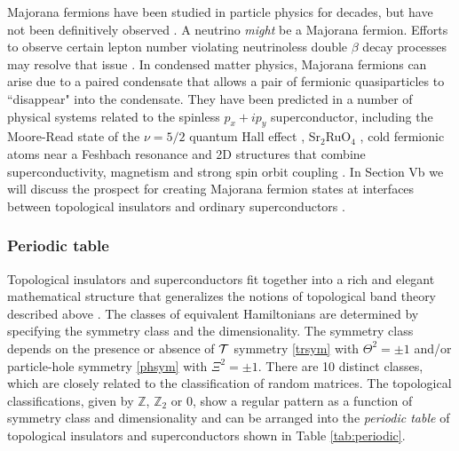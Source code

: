 \documentclass[twocolumn,floatfix,showpacs,rmp,aps]{revtex4}
\begin{document}
Majorana fermions have been studied in particle
physics for decades, but have not been definitively observed \cite{majorana37,wilczek09}.
A neutrino {\it might} be a Majorana fermion.  Efforts to observe
certain lepton number violating
neutrinoless double $\beta$ decay processes may resolve that issue \cite{avignone08}.
In condensed matter physics, Majorana fermions can arise due to
a paired condensate that allows a pair of fermionic quasiparticles to
``disappear" into the condensate.  They have been predicted in a
number of physical systems related to the spinless
$p_x+i p_y$ superconductor, including the Moore-Read state of the
$\nu=5/2$ quantum Hall effect \cite{mooreread91,greiter92,readgreen00}, Sr$_2$RuO$_4$ \cite{dassarma06},
cold fermionic atoms near a Feshbach resonance \cite{gurarie05,tewari07} and
2D structures that combine superconductivity, magnetism and strong
spin orbit coupling \cite{sato09,sau10,lee09}.
In Section Vb we will discuss the prospect for creating
Majorana fermion states at interfaces between topological
insulators and ordinary superconductors \cite{fukane08}.

\subsubsection{Periodic table}
\label{sec:periodic}

Topological insulators and superconductors fit together into a rich and elegant
mathematical structure that generalizes the notions of topological band
theory described above \cite{schnyder08,schnyder09,kitaev09,ryu09}.  The classes of equivalent Hamiltonians are determined by specifying the
symmetry class and the dimensionality.  The symmetry class depends on
the presence or absence of ${\cal T}$ symmetry \eqref{trsym} with $\Theta^2=\pm 1$ and/or
particle-hole symmetry \eqref{phsym} with $\Xi^2=\pm 1$.  There are 10 distinct classes,
which are closely related to the \textcite{altland97} classification of random
matrices.  The topological classifications, given by
$\mathbb{Z}$, $\mathbb{Z}_2$ or $0$, show a regular pattern as a function of
symmetry class and dimensionality and can be arranged into the {\it periodic
table} of topological insulators and superconductors shown in Table \ref{tab:periodic}.
\end{document}
